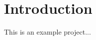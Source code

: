 \documentclass{article}
\begin{document}
\maketitle

\section*{Introduction}
This is an example project... \cite{Allen2003}

\GTDBib[apalike]


\listActions
\listPurchases
\listContacts
\listProjects

\GTDoutput
\end{document}
